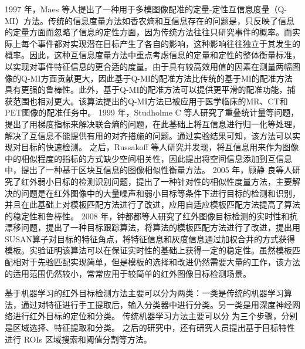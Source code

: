 1997 年，Maes 等人提出了一种用于多模图像配准的定量-定性互信息度量\cite{maes1997multimodality}（Q-MI）方法。传统的信息度量方法如香农熵和互信息存在的问题是，只反映了信息的定量方面而忽略了信息的定性方面，因为传统方法往往只研究事件的概率。而实际上每个事件都对实现潜在目标产生了各自的影响，这种影响往往独立于其发生的概率。因此，这种互信息度量方法中重点考虑信息的定量和定性的整体衡量标准，以实现对事件特征信息的更合适的度量。由于具有较高效用值的因素在测量两幅图像的Q-MI方面贡献更大，因此基于Q-MI的配准方法比传统的基于MI的配准方法具有更强的鲁棒性。此外，基于Q-MI的配准方法可以提供更平滑的配准功能，捕获范围也相对更大。该算法提出的Q-MI方法已被应用于医学临床的MR、CT和PET图像的配准任务中。
1999 年，Studholme C 等人研究了重叠统计量等问题\cite{studholme1999overlap}，提出了用梯度指标来解决联合熵的问题，在此基础上将互信息进行归一化等处理，解决了互信息不能提供有用的对齐措施的问题。通过实验结果可知，该方法可以实现对目标的快速检测。
之后，Russakoff 等人研究并发现，将互信息用来作为图像中的相似程度的指标的方式缺少空间相关性，因此提出将空间信息添加到互信息中，提出了一种基于区块互信息的图像相似性衡量方法\cite{russakoff2004image}。
2005 年，顾静
良等人研究了红外弱小目标的检测识别问题，提出了一种针对性的相似性度量方法，主要解决的问题是在红外图像中的大量噪声和弱小目标等条件下进行目标的检测和识别，并且在此基础上对模板匹配方法进行了改进，应用自适应模板匹配方法提高了算法的稳定性和鲁棒性\cite{顾静良2005基于自适应模板匹配的红外弱小目标检测}。
2008 年，钟都都等人研究了红外图像目标检测的实时性和抗漂移问题\cite{钟都都2008用于红外目标跟踪的模板匹配改进算法}，提出了一种目标跟踪算法，将算法的模板匹配方法进行了改进，提出用SUSAN算子对目标的特征角点，将特征信息和灰度信息通过加权合并的方式获得模板。实验证明该算法可以在保证实时性的基础上获得一定的稳定性。虽然模板匹配相对于先验匹配实现简单，但是模板的选择和改进仍然需要大量的工作，该方法的适用范围仍然较小，常常应用于较简单的红外图像目标检测场景。

基于机器学习的红外目标检测方法主要可以分为两类：一类是传统的机器学习算法，通过对特征进行手工提取后，输入分类器中进行分类。另一类是用深度神经网络进行红外目标的定位和分类。
传统机器学习方法主要可以分
为三个步骤，分别是区域选择、特征提取和分类。
之后的研究中，还有研究人员提出基于目标特性进行 ROIs
区域搜索和阈值分割等方法。

